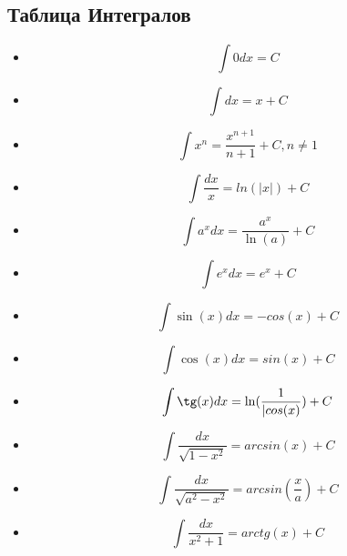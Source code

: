 \documentclass[oneside]{book}
\begin{document}
\begin{enumerate}
\begin{itemize}
\begin{enumerate}
\section{Таблица Интегралов\\}
\begin{itemize}
  \item \begin{equation}
    \int 0 dx = C
  \end{equation}
  \item \begin{equation}
    \int dx = x + C
  \end{equation}
  \item \begin{equation}
    \int x^n = \frac{x^{n+1}}{n+1}+C, n \neq 1
  \end{equation}
  \item \begin{equation}
    \int \frac{dx}{x} = ln(|x|) + C
  \end{equation}
  \item \begin{equation}
    \int a^x dx = \frac{a^x}{\ln(a)} + C
  \end{equation}
  \item \begin{equation}
    \int e^x dx = e^x + C
  \end{equation}
  \item \begin{equation}
    \int \sin(x) dx = -cos(x) + C
  \end{equation}
  \item \begin{equation}
    \int \cos(x) dx = sin(x) + C
  \end{equation}
  \item \begin{equation}
    \int \tg(x) dx = \ln(\frac{1}{|cos(x)}) + C
  \end{equation}
  \item \begin{equation}
    \int \frac{dx}{\sqrt{1 - x^2}} = arcsin(x) + C
  \end{equation}
  \item \begin{equation}
    \int \frac{dx}{\sqrt{a^2 - x^2}} = arcsin(\frac{x}{a}) + C
  \end{equation}
  \item \begin{equation}
    \int \frac{dx}{x^2 + 1} = arctg(x) + C

\end{equation}
\end{itemize}
\end{enumerate}
\end{itemize}
\end{enumerate}
\end{document}
